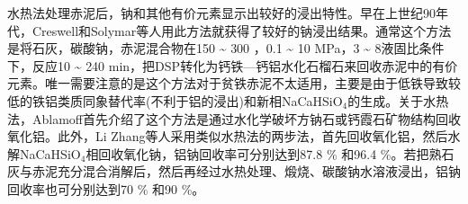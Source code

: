 水热法处理赤泥后，钠和其他有价元素显示出较好的浸出特性。早在上世纪90年代，Creswell\cite{cresswell1982hydrothermal}和Solymar\cite{solymar1997technical}等人用此方法就获得了较好的钠浸出结果。通常这个方法是将石灰，碳酸钠，赤泥混合物在150 \textasciitilde{ }300 \textcelsius，0.1 \textasciitilde{ }10 MPa，3 \textasciitilde{ }8液固比条件下，反应10 \textasciitilde{ }240 min，把DSP转化为钙铁—钙铝水化石榴石来回收赤泥中的有价元素\cite{cao2013phase,cresswell1982hydrothermal,zhang2011recovery,zhong2009extraction}。唯一需要注意的是这个方法对于贫铁赤泥不太适用，主要是由于低铁导致较低的铁铝类质同象替代率(不利于铝的浸出)和新相NaCaHSiO$ _{\mathrm{4}} $的生成\cite{zhang2011recovery}。关于水热法，Ablamoff\cite{ablamoff1988physical}首先介绍了这个方法是通过水化学破坏方钠石或钙霞石矿物结构回收氧化铝。此外，Li Zhang\cite{zhong2009extraction}等人采用类似水热法的两步法，首先回收氧化铝，然后水解NaCaHSiO$ _{\mathrm{4}} $相回收氧化钠，铝钠回收率可分别达到87.8 \% 和96.4 \%。若把熟石灰与赤泥充分混合消解后，然后再经过水热处理、煅烧、碳酸钠水溶液浸出，铝钠回收率也可分别达到70 \% 和90 \%\cite{liu1997treatment}。

